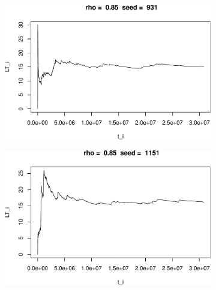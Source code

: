 \documentclass[]{article}
\begin{document}
\begin{figure}[h!]
\begin{subfigure}[b]{.55\linewidth}

\includegraphics[width=\linewidth]{003_files/figure-latex/unnamed-chunk-20-3.pdf}
\end{subfigure}\hfill
\begin{subfigure}[b]{.55\linewidth}
\includegraphics[width=\linewidth]{003_files/figure-latex/unnamed-chunk-20-4.pdf}
\end{subfigure}\vfill
\end{figure}
\end{document}
